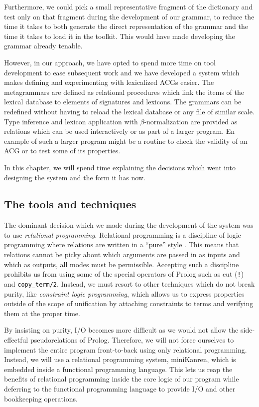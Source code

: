Furthermore, we could pick a small representative fragment of the
dictionary and test only on that fragment during the development of our
grammar, to reduce the time it takes to both generate the direct
representation of the grammar and the time it takes to load it in the
toolkit. This would have made developing the grammar already
tenable.

However, in our approach, we have opted to spend more time on tool
development to ease subsequent work and we have developed a system which
makes defining and experimenting with lexicalized ACGs easier. The
metagrammars are defined as relational procedures which link the items
of the lexical database to elements of signatures and lexicons. The
grammars can be redefined without having to reload the lexical database
or any file of similar scale. Type inference and lexicon application
with $\beta$-normalization are provided as relations which can be used
interactively or as part of a larger program. En example of such a
larger program might be a routine to check the validity of an ACG or to
test some of its properties.

In this chapter, we will spend time explaining the decisions which went
into designing the system and the form it has now.

\subsection{The tools and techniques}

The dominant decision which we made during the development of the system
was to use \emph{relational programming}. Relational programming is a
discipline of logic programming where relations are written in a
``pure'' style \cite{byrd2010relational}. This means that relations
cannot be picky about which arguments are passed in as inputs and which
as outputs, all modes must be permissible. Accepting such a discipline
prohibits us from using some of the special operators of Prolog such as
cut (\texttt{!}) and \texttt{copy\_term/2}. Instead, we must resort to
other techniques which do not break purity, like \emph{constraint logic
  programming}, which allows us to express properties outside of the
scope of unification by attaching constraints to terms and verifying
them at the proper time.

By insisting on purity, I/O becomes more difficult as we would not allow
the side-effectful pseudorelations of Prolog. Therefore, we will not
force ourselves to implement the entire program front-to-back using only
relational programming. Instead, we will use a relational programming
system, miniKanren, which is embedded inside a functional programming
language. This lets us reap the benefits of relational programming
inside the core logic of our program while deferring to the functional
programming language to provide I/O and other bookkeeping operations.

